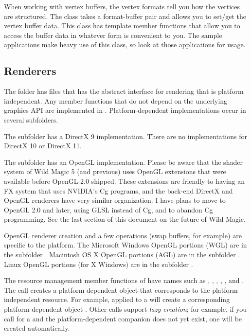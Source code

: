 \documentclass{article}
\begin{document}
When working with vertex buffers, the vertex formats tell you how the
vertices are structured.  The class  takes a
format-buffer pair and allows you to set/get the vertex buffer data.
This class has template member functions that allow you to access the
buffer data in whatever form is convenient to you.  The sample applications
make heavy use of this class, so look at those applications for usage.

\subsection{Renderers}

The  folder has files  that
has the abstract interface for rendering that is platform independent.  Any
member functions that do not depend on the underlying graphics API are
implemented in .  Platform-dependent implementations
occur in several subfolders.

The  subfolder has a DirectX 9 implementation.  There are
no implementations for DirectX 10 or DirectX 11.

The  subfolder has an OpenGL implementation.  Please be
aware that the shader system of Wild Magic 5 (and previous) uses OpenGL
extensions that were available before OpenGL 2.0 shipped.  These extensions
are friendly to having an FX system that uses NVIDIA's Cg programs, and
the back-end DirectX and OpenGL renderers have very similar organization.
I have plans to move to OpenGL 2.0 and later, using GLSL instead of Cg,
and to abandon Cg programming.  See the last section of this document on
the future of Wild Magic.

OpenGL renderer creation and a few operations (swap buffers, for example) are
specific to the platform.  The Microsoft Windows OpenGL portions (WGL) are
in the subfolder .  Macintosh OS X OpenGL portions (AGL)
are in the subfolder .  Linux OpenGL portions (for
X Windows) are in the subfolder .

The resource management member functions of  have names such
as , , , , ,
and .  The  call creates a platform-dependent
object that corresponds to the platform-independent resource.  For example,
 applied to a  will create a corresponding
platform-dependent object .  Other calls support
{\em lazy creation}; for example, if you call  for a
 and the platform-dependent companion 
does not yet exist, one will be created automatically.
\end{document}
